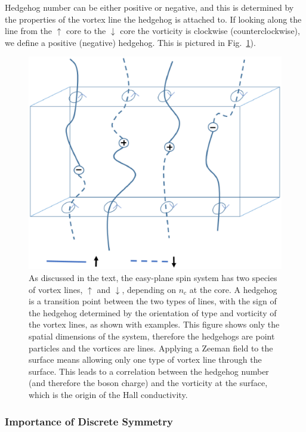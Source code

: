 \documentclass[prb,twocolumn]{revtex4-1}
\begin{document}
Hedgehog number can be either positive or negative, and this is determined by the properties of the vortex line the hedgehog is attached to.
If looking along the line from the $\uparrow$ core to the $\downarrow$ core the vorticity is clockwise (counterclockwise), we define a positive (negative) hedgehog.  This is pictured in Fig.~\ref{monopoles}).


\begin{figure}
\includegraphics[width=\linewidth]{figures/monopoles.eps}
\caption{As discussed in the text, the easy-plane spin system has two species of vortex lines, $\uparrow$ and $\downarrow$, depending on $n_c$ at the core. A hedgehog is a transition point between the two types of lines, with the sign of the hedgehog determined by the orientation of type and vorticity of the vortex lines, as shown with examples. This figure shows only the spatial dimensions of the system, therefore the hedgehogs are point particles and the vortices are lines. Applying a Zeeman field to the surface means allowing only one type of vortex line through the surface. This leads to a correlation between the hedgehog number (and therefore the boson charge) and the vorticity at the surface, which is the origin of the Hall conductivity.}
\label{monopoles}
\end{figure}


\subsubsection{Importance of Discrete Symmetry}
\end{document}
